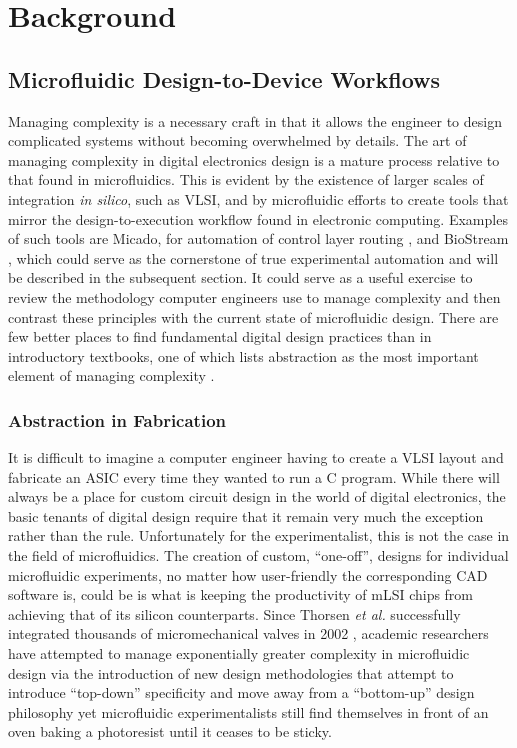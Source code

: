 \chapter{Background}
\label{chapter:background}
\thispagestyle{myheadings}

\graphicspath{{1a_background/Figures/}}

\section{Microfluidic Design-to-Device Workflows}
\label{sec:backgroundMF}

Managing complexity is a necessary craft in that it allows the engineer to design complicated systems without becoming overwhelmed by details. The art of managing complexity in digital electronics design is  a mature process relative to that found in microfluidics. This is evident by the existence of larger scales of integration \emph{in silico}, such as VLSI, and by microfluidic efforts to create tools that mirror the design-to-execution workflow found in electronic computing. Examples of such tools are Micado, for automation of control layer routing \cite{amin2009}, and BioStream \cite{thies2008}, which could serve as the cornerstone of true experimental automation and will be described in the subsequent section. It could serve as a useful exercise to review the methodology computer engineers use to manage complexity and then contrast these principles with the current state of microfluidic design. There are few better places to find fundamental digital design practices than in introductory textbooks, one of which lists abstraction as the most important element of managing complexity \cite{Harris+Harris}.

\subsection{Abstraction in Fabrication}
\label{ssec:backgroundAbsFab}

It is difficult to imagine a computer engineer having to create a VLSI layout and fabricate an ASIC every time they wanted to run a C program. While there will always be a place for custom circuit design in the world of digital electronics, the basic tenants of digital design require that it remain very much the exception rather than the rule. Unfortunately for the experimentalist, this is not the case in the field of microfluidics. The creation of custom, ``one-off'', designs for individual microfluidic experiments, no matter how user-friendly the corresponding CAD software is, could be is what is keeping the productivity of mLSI chips from achieving that of its silicon counterparts. Since Thorsen \emph{et al.} successfully integrated thousands of micromechanical valves in 2002 \cite{thorsen2002}, academic researchers have attempted to manage exponentially greater complexity in microfluidic design via the introduction of new design methodologies that attempt to introduce ``top-down'' specificity and move away from a ``bottom-up'' design philosophy \cite{minhass2013}\cite{melin2007}\cite{minhass2012} yet microfluidic experimentalists still find themselves in front of an oven baking a photoresist until it ceases to be sticky. 

